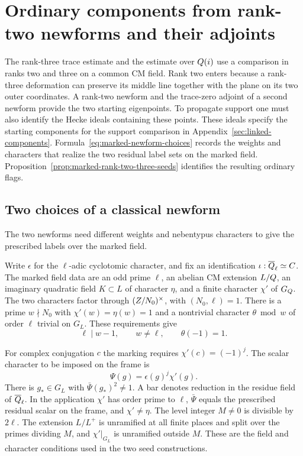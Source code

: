 \section{Ordinary components from rank-two newforms and their adjoints}
\label{sec:linked-seeds}
\hypertarget{source-ordinary-linked-seeds}{}

The rank-three trace estimate and the estimate over \(Q(i)\)
use a comparison in ranks two and three on a common
CM field. Rank two enters because a rank-three deformation can preserve
its middle line together with the plane on its two outer coordinates.
A rank-two newform and the trace-zero adjoint of a second newform provide the two starting eigenpoints. To propagate support one must also identify the Hecke ideals containing these points. These ideals
specify the starting components for the support comparison
in Appendix~\ref{sec:linked-components}. Formula~\eqref{eq:marked-newform-choices} records the weights and characters that realize the two residual label sets on the marked field. Proposition~\ref{prop:marked-rank-two-three-seeds} identifies the resulting ordinary flags.

\subsection{Two choices of a classical newform}
\label{subsec:marked-newform-parameters}

The two newforms need different weights and nebentypus characters to give the prescribed labels over the marked field.

Write \(\epsilon\) for the \(\ell\)-adic cyclotomic character, and fix
an identification \(\iota:\overline{Q}_\ell\simeq C\). The marked
field data are an odd prime \(\ell\), an abelian CM extension \(L/Q\),
an imaginary quadratic field \(K\subset L\) of character \(\eta\),
and a finite character \(\chi'\) of \(G_Q\). The two characters
factor through \((Z/N_0)^\times\), with \((N_0,\ell)=1\).
There is a prime \(w\nmid N_0\) with \(\chi'(w)=\eta(w)=1\) and
a nontrivial character \(\theta\bmod w\) of order \(\ell\)
trivial on \(G_L\). These requirements give
\[ \ell\mid w-1,\qquad w\ne\ell,\qquad \theta(-1)=1 . \]

For complex conjugation \(c\) the marking requires
\(\chi'(c)=(-1)^j\). The scalar character to be imposed on the frame is
\[
 \Psi(g)=\epsilon(g)^j\chi'(g) .
\] There is
\(g_*\in G_L\) with \(\bar\Psi(g_*)^2\ne1\). A bar denotes
reduction in the residue field of \(\overline{Q}_\ell\).
In the application \(\chi'\) has order prime to \(\ell\),
\(\bar\Psi\) equals the prescribed residual scalar on the frame,
and \(\chi'\ne\eta\). The level integer \(M\ne0\) is divisible
by \(2\ell\). The extension \(L/L^+\) is unramified at all finite
places and split over the primes dividing \(M\), and
\(\chi'|_{G_L}\) is unramified outside \(M\). These are the
field and character conditions used in the two seed constructions.


